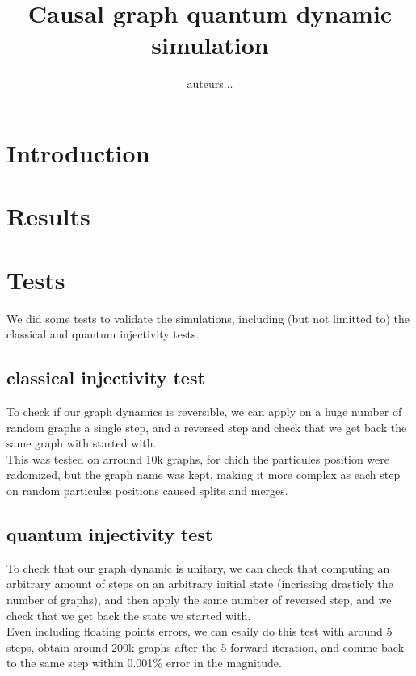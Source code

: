 \documentclass[11pt]{article}
\title{\textbf{Causal graph quantum dynamic simulation}}
\author{auteurs...}
\date{}
\begin{document}
\maketitle
\thispagestyle{empty}

\section{Introduction}

\section{Results}

\section{Tests}

We did some tests to validate the simulations, including (but not limitted to) the classical and quantum injectivity tests.

\subsection{classical injectivity test}

To check if our graph dynamics is reversible, we can apply on a huge number of random graphs a single step, and a reversed step and check that we get back the same graph with started with.\\

This was tested on arround 10k graphs, for chich the particules position were radomized, but the graph name was kept, making it more complex as each step on random particules positions caused splits and merges.

\subsection{quantum injectivity test}

To check that our graph dynamic is unitary, we can check that computing an arbitrary amount of steps on an arbitrary initial state (incrissing drasticly the number of graphs), and then apply the same number of reversed step, and we check that we get back the state we started with.\\

Even including floating points errors, we can esaily do this test with around 5 steps, obtain around 200k graphs after the 5 forward iteration, and comme back to the same step within 0.001\% error in the magnitude.
\end{document}

